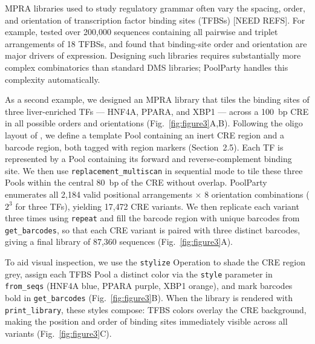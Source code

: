 \documentclass[unnumsec,webpdf,modern,large]{mam-authoring-template}%
\theoremstyle{thmstyleone}%
\theoremstyle{thmstyletwo}%
\theoremstyle{thmstylethree}%
\begin{document}
MPRA libraries used to study regulatory grammar often vary the spacing, order, and orientation of transcription factor binding sites (TFBSs) [NEED REFS]. For example, \citet{GeorgakopoulosSoares2023tf} tested over 200{,}000 sequences containing all pairwise and triplet arrangements of 18 TFBSs, and found that binding-site order and orientation are major drivers of expression. Designing such libraries requires substantially more complex combinatorics than standard DMS libraries; PoolParty handles this complexity automatically. 

As a second example, we designed an MPRA library that tiles the binding sites of three liver-enriched TFs --- HNF4A, PPARA, and XBP1 --- across a 100~bp CRE in all possible orders and orientations (Fig.~\ref{fig:figure3}A,B). Following the oligo layout of \citet{Melnikov2012dw}, we define a template Pool containing an inert CRE region and a barcode region, both tagged with region markers (Section~2.5). Each TF is represented by a Pool containing its forward and reverse-complement binding site. We then use \texttt{replacement\_multiscan} in sequential mode to tile these three Pools within the central 80~bp of the CRE without overlap. PoolParty enumerates all 2{,}184 valid positional arrangements $\times$ 8 orientation combinations ($2^3$ for three TFs), yielding 17{,}472 CRE variants. We then replicate each variant three times using \texttt{repeat} and fill the barcode region with unique barcodes from \texttt{get\_barcodes}, so that each CRE variant is paired with three distinct barcodes, giving a final library of 87{,}360 sequences (Fig.~\ref{fig:figure3}A). 

To aid visual inspection, we use the \texttt{stylize} Operation to shade the CRE region grey, assign each TFBS Pool a distinct color via the \texttt{style} parameter in \texttt{from\_seqs} (HNF4A blue, PPARA purple, XBP1 orange), and mark barcodes bold in \texttt{get\_barcodes} (Fig.~\ref{fig:figure3}B). When the library is rendered with \texttt{print\_library}, these styles compose: TFBS colors overlay the CRE background, making the position and order of binding sites immediately visible across all variants (Fig.~\ref{fig:figure3}C).

\end{document}
